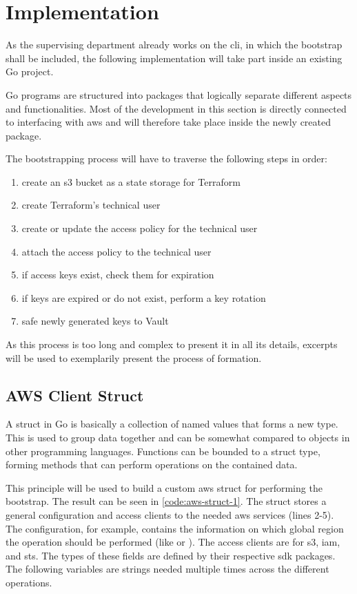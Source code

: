\chapter{Implementation}
As the supervising department already works on the \ac{cli}, in which the bootstrap shall be included, the following implementation will take part inside an existing Go project.

Go programs are structured into packages that logically separate different aspects and functionalities.
Most of the development in this section is directly connected to interfacing with \ac{aws} and will therefore take place inside the newly created  package.

The bootstrapping process will have to traverse the following steps in order:
\begin{enumerate}
    \item create an \ac{s3} bucket as a state storage for Terraform
    \item create Terraform's technical user
    \item create or update the access policy for the technical user
    \item attach the access policy to the technical user
    \item if access keys exist, check them for expiration
    \item if keys are expired or do not exist, perform a key rotation
    \item safe newly generated keys to Vault
\end{enumerate}
As this process is too long and complex to present it in all its details, excerpts will be used to exemplarily present the process of formation.

\section{AWS Client Struct}
A struct in Go is basically a collection of named values that forms a new type.
This is used to group data together and can be somewhat compared to objects in other programming languages.
Functions can be bounded to a struct type, forming methods that can perform operations on the contained data.

This principle will be used to build a custom \ac{aws} struct for performing the bootstrap.
The result can be seen in \autoref{code:aws-struct-1}.
The struct stores a general configuration and access clients to the needed \ac{aws} services (lines 2-5).
The configuration, for example, contains the information on which global region the operation should be performed (like  or ).
The access clients are for \ac{s3}, \ac{iam}, and \ac{sts}.
The types of these fields are defined by their respective \ac{sdk} packages.
The following variables are strings needed multiple times across the different operations.

